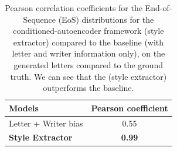 
  \begin{table}[!htbp]
  \centering
  \begin{tabular}{l|c}
  \hline
  Models & Pearson coefficient\\ \hline
  Letter + Writer bias & 0.55\\ \hline
  \textbf{Style Extractor} & \textbf{0.99} \\ \hline
  \end{tabular}
  \caption{Pearson correlation coefficients for the End-of-Sequence (EoS) distributions for the conditioned-autoencoder framework (style extractor) compared to the baseline (with letter and writer information only), on the generated letters compared to the ground truth. We can see that the (style extractor) outperforms the baseline.}
  \label{table:EoS_gen}
  \end{table}


